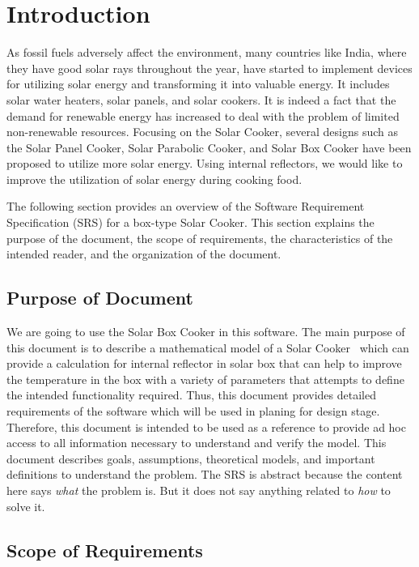\documentclass[12pt]{article}
\begin{document}
\newpage


\section{Introduction}

As fossil fuels adversely affect the environment, many countries like India, where they have good solar rays throughout the year, have started to implement devices for utilizing solar energy and transforming it into valuable energy. It includes solar water heaters, solar panels, and solar cookers. It is indeed a fact that the demand for renewable energy has increased to deal with the problem of limited non-renewable resources. Focusing on the Solar Cooker, several designs such as the Solar Panel Cooker, Solar Parabolic Cooker, and Solar Box Cooker have been proposed to utilize more solar energy. Using internal reflectors, we would like to improve the utilization of solar energy during cooking food.   

The following section provides an overview of the Software Requirement Specification (SRS) for a box-type Solar Cooker. This section explains the purpose of the document, the scope of requirements, the characteristics of the intended reader, and the organization of the document.   


\subsection{Purpose of Document}

We are going to use the Solar Box Cooker in this software. The main purpose of this document is to describe a mathematical model of a Solar Cooker~\cite{MathsModel} which can provide a calculation for internal reflector in solar box that can help to improve the temperature in the box with a variety of parameters that attempts to define the intended functionality required. Thus, this document provides detailed requirements of the software which will be used in planing for design stage. Therefore, this document is intended to be used as a reference to provide ad hoc access to all information necessary to understand and verify the model. This document describes goals, assumptions, theoretical models, and important definitions to understand the problem. The SRS is abstract because the content here says \emph{what} the problem is. But it does not say anything related to \emph{how} to solve it.

\subsection{Scope of Requirements} 
\end{document}
